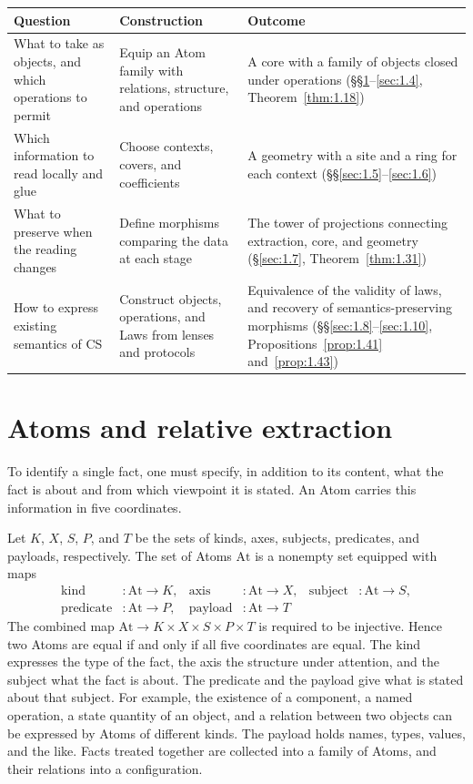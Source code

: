 \begin{xltabular}{\linewidth}{@{}LLL@{}}
\toprule
Question & Construction & Outcome \\
\midrule
\endhead
What to take as objects, and which operations to permit & Equip an Atom family with relations, structure, and operations & A core with a family of objects closed under operations (\S\S\ref{sec:1.1}--\ref{sec:1.4}, Theorem~\ref{thm:1.18}) \\
\addlinespace[3pt]
Which information to read locally and glue & Choose contexts, covers, and coefficients & A geometry with a site and a ring for each context (\S\S\ref{sec:1.5}--\ref{sec:1.6}) \\
\addlinespace[3pt]
What to preserve when the reading changes & Define morphisms comparing the data at each stage & The tower of projections connecting extraction, core, and geometry (\S\ref{sec:1.7}, Theorem~\ref{thm:1.31}) \\
\addlinespace[3pt]
How to express existing semantics of CS & Construct objects, operations, and Laws from lenses and protocols & Equivalence of the validity of laws, and recovery of semantics-preserving morphisms (\S\S\ref{sec:1.8}--\ref{sec:1.10}, Propositions~\ref{prop:1.41} and~\ref{prop:1.43}) \\
\bottomrule
\end{xltabular}

\section{Atoms and relative extraction}\label{sec:1.1}

To identify a single fact, one must specify, in addition to its content, what the
fact is about and from which viewpoint it is stated. An Atom carries this
information in five coordinates.

\begin{definition}\label{def:1.1}

Let $K$, $X$, $S$, $P$, and $T$ be the sets of kinds, axes, subjects, predicates,
and payloads, respectively. The set of Atoms $\mathrm{At}$ is a nonempty set
equipped with maps
\[
\begin{aligned}
\mathrm{kind}&:\mathrm{At}\to K,&
\mathrm{axis}&:\mathrm{At}\to X,&
\mathrm{subject}&:\mathrm{At}\to S,\\
\mathrm{predicate}&:\mathrm{At}\to P,&
\mathrm{payload}&:\mathrm{At}\to T
\end{aligned}
\]
The combined map
$\mathrm{At}\to K\times X\times S\times P\times T$ is required to be injective.
Hence two Atoms are equal if and only if all five coordinates are equal.
The kind expresses the type of the fact, the axis the structure under attention,
and the subject what the fact is about. The predicate and the payload give what is
stated about that subject. For example, the existence of a component, a named
operation, a state quantity of an object, and a relation between two objects can
be expressed by Atoms of different kinds. The payload holds names, types, values,
and the like. Facts treated together are collected into a family of Atoms, and
their relations into a configuration.

\end{definition}

